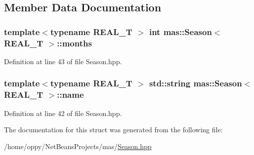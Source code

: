 \subsection{Member Data Documentation}
\hypertarget{structmas_1_1_season_aad51659a30850ce9ee579e625ec0a212}{
\subsubsection[{months}]{\setlength{\rightskip}{0pt plus 5cm}template$<$typename R\-E\-A\-L\-\_\-\-T $>$ int {\bf mas\-::\-Season}$<$ R\-E\-A\-L\-\_\-\-T $>$\-::months}}\label{structmas_1_1_season_aad51659a30850ce9ee579e625ec0a212}


Definition at line 43 of file Season.\-hpp.

\hypertarget{structmas_1_1_season_a04a3d17eb36c71f3f5474468d2d73605}{
\subsubsection[{name}]{\setlength{\rightskip}{0pt plus 5cm}template$<$typename R\-E\-A\-L\-\_\-\-T $>$ std\-::string {\bf mas\-::\-Season}$<$ R\-E\-A\-L\-\_\-\-T $>$\-::name}}\label{structmas_1_1_season_a04a3d17eb36c71f3f5474468d2d73605}


Definition at line 42 of file Season.\-hpp.



The documentation for this struct was generated from the following file\-:\begin{DoxyCompactItemize}
\item 
/home/oppy/\-Net\-Beans\-Projects/mas/\hyperlink{_season_8hpp}{Season.\-hpp}\end{DoxyCompactItemize}
